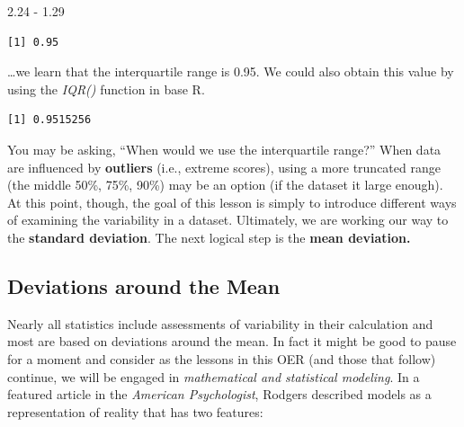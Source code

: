 \documentclass[
  11pt,
]{book}
\newenvironment{Shaded}{\begin{snugshade}}{\end{snugshade}}
\newcommand{\AttributeTok}[1]{\textcolor[rgb]{0.77,0.63,0.00}{#1}}
\newcommand{\ConstantTok}[1]{\textcolor[rgb]{0.00,0.00,0.00}{#1}}
\newcommand{\FloatTok}[1]{\textcolor[rgb]{0.00,0.00,0.81}{#1}}
\newcommand{\FunctionTok}[1]{\textcolor[rgb]{0.00,0.00,0.00}{#1}}
\newcommand{\NormalTok}[1]{#1}
\newcommand{\SpecialCharTok}[1]{\textcolor[rgb]{0.00,0.00,0.00}{#1}}
\begin{document}
\begin{Shaded}
\begin{Highlighting}[]
\FloatTok{2.24} \SpecialCharTok{{-}} \FloatTok{1.29}
\end{Highlighting}
\end{Shaded}

\begin{verbatim}
[1] 0.95
\end{verbatim}

\ldots we learn that the interquartile range is 0.95. We could also obtain this value by using the \emph{IQR()} function in base R.

\begin{Shaded}
\end{Shaded}

\begin{verbatim}
[1] 0.9515256
\end{verbatim}

You may be asking, ``When would we use the interquartile range?'' When data are influenced by \textbf{outliers} (i.e., extreme scores), using a more truncated range (the middle 50\%, 75\%, 90\%) may be an option (if the dataset it large enough). At this point, though, the goal of this lesson is simply to introduce different ways of examining the variability in a dataset. Ultimately, we are working our way to the \textbf{standard deviation}. The next logical step is the \textbf{mean deviation.}

\hypertarget{deviations-around-the-mean}{%
\subsection{Deviations around the Mean}\label{deviations-around-the-mean}}

Nearly all statistics include assessments of variability in their calculation and most are based on deviations around the mean. In fact it might be good to pause for a moment and consider as the lessons in this OER (and those that follow) continue, we will be engaged in \emph{mathematical and statistical modeling}. In a featured article in the \emph{American Psychologist}, Rodgers \citeyearpar{rodgers_epistemology_2010} described models as a representation of reality that has two features:
\end{document}
